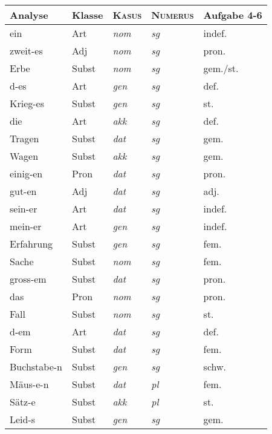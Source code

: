 

\begin{center}
  \begin{tabular}[h]{lllll}
    \lsptoprule
    \textbf{Analyse} & \textbf{Klasse} & \textbf{\textsc{Kasus}} & \textbf{\textsc{Numerus}} & \textbf{Aufgabe 4-6} \\
    \midrule
    ein & Art & \textit{nom} & \textit{sg} & indef. \\
    zweit-es & Adj & \textit{nom} & \textit{sg} & pron. \\
    Erbe & Subst & \textit{nom} & \textit{sg} & gem./st. \\
    d-es & Art & \textit{gen} & \textit{sg} & def. \\
    Krieg-es & Subst & \textit{gen} & \textit{sg} & st. \\
    die & Art & \textit{akk} & \textit{sg} & def. \\
    Tragen & Subst & \textit{dat} & \textit{sg} & gem. \\
    Wagen & Subst & \textit{akk} & \textit{sg} & gem. \\
    einig-en & Pron & \textit{dat} & \textit{sg} & pron. \\
    gut-en & Adj & \textit{dat} & \textit{sg} & adj. \\
    sein-er & Art & \textit{dat} & \textit{sg} & indef. \\
    mein-er & Art & \textit{gen} & \textit{sg} & indef. \\
    Erfahrung & Subst & \textit{gen} & \textit{sg} & fem. \\
    Sache & Subst & \textit{nom} & \textit{sg} & fem. \\
    gross-em & Subst & \textit{dat} & \textit{sg} & pron. \\
    das & Pron & \textit{nom} & \textit{sg} & pron. \\
    Fall & Subst & \textit{nom} & \textit{sg} & st. \\
    d-em & Art & \textit{dat} & \textit{sg} & def. \\
    Form & Subst & \textit{dat} & \textit{sg} & fem. \\
    Buchstabe-n & Subst & \textit{gen} & \textit{sg} & schw. \\
    Mäus-e-n & Subst & \textit{dat} & \textit{pl} & fem. \\
    Sätz-e & Subst & \textit{akk} & \textit{pl} & st. \\
    Leid-s & Subst & \textit{gen} & \textit{sg} & gem. \\

\end{tabular}
\end{center}
